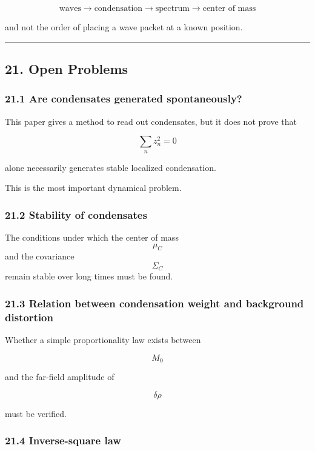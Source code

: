 \documentclass[
  a4paper,
]{article}
\begin{document}
\[
\boxed{
\text{waves}
\rightarrow
\text{condensation}
\rightarrow
\text{spectrum}
\rightarrow
\text{center of mass}
}
\]

and not the order of placing a wave packet at a known position.

\begin{center}\rule{0.5\linewidth}{0.5pt}\end{center}

\subsection{21. Open Problems}\label{open-problems}

\subsubsection{21.1 Are condensates generated
spontaneously?}\label{are-condensates-generated-spontaneously}

This paper gives a method to read out condensates, but it does not prove
that

\[
\sum_n z_n^2=0
\]

alone necessarily generates stable localized condensation.

This is the most important dynamical problem.

\subsubsection{21.2 Stability of
condensates}\label{stability-of-condensates}

The conditions under which the center of mass \[\mu_C\] and the
covariance \[\Sigma_C\] remain stable over long times must be found.

\subsubsection{21.3 Relation between condensation weight and background
distortion}\label{relation-between-condensation-weight-and-background-distortion}

Whether a simple proportionality law exists between

\[
M_0
\]

and the far-field amplitude of

\[
\delta\rho
\]

must be verified.

\subsubsection{21.4 Inverse-square law}\label{inverse-square-law}
\end{document}
